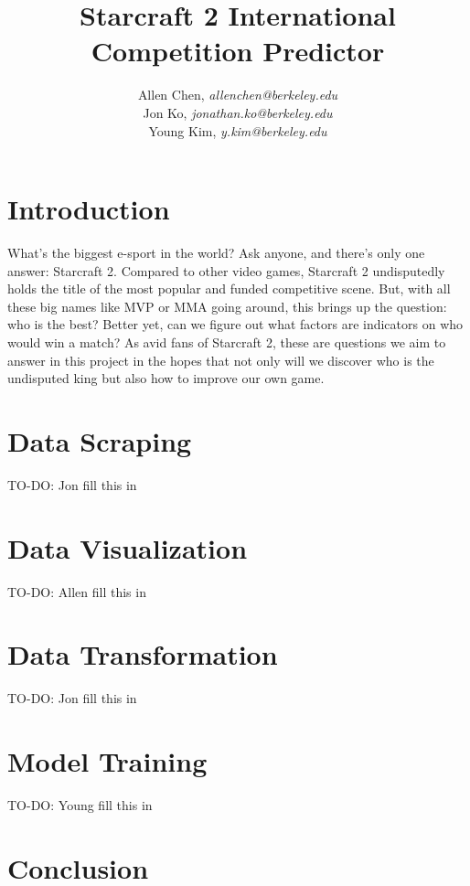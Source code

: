 \documentclass[11pt]{handout}
\author{
  Allen Chen, \emph{allenchen@berkeley.edu}\\
  Jon Ko, \emph{jonathan.ko@berkeley.edu}\\
  Young Kim, \emph{y.kim@berkeley.edu}\\
}
\title{Starcraft 2 International Competition Predictor}
\begin{document}
\maketitle

\section{Introduction}
What's the biggest e-sport in the world? Ask anyone, and there's only one answer: Starcraft 2. Compared to other video games, Starcraft 2 undisputedly holds the title of the most popular and funded competitive scene. But, with all these big names like MVP or MMA going around, this brings up the question: who is the best? Better yet, can we figure out what factors are indicators on who would win a match? As avid fans of Starcraft 2, these are questions we aim to answer in this project in the hopes that not only will we discover who is the undisputed king but also how to improve our own game.

\section{Data Scraping}
TO-DO: Jon fill this in


\section{Data Visualization}
TO-DO: Allen fill this in


\section{Data Transformation}
TO-DO: Jon fill this in


\section{Model Training}
TO-DO: Young fill this in


\section{Conclusion}
\end{document}
